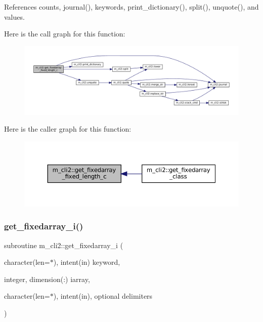 References counts, journal(), keywords, print\+\_\+dictionary(), split(), unquote(), and values.

Here is the call graph for this function\+:\nopagebreak
\begin{figure}[H]
\begin{center}
\leavevmode
\includegraphics[width=350pt]{namespacem__cli2_a8000c5e05f6c84ba17350d4a00850a6a_cgraph}
\end{center}
\end{figure}
Here is the caller graph for this function\+:\nopagebreak
\begin{figure}[H]
\begin{center}
\leavevmode
\includegraphics[width=350pt]{namespacem__cli2_a8000c5e05f6c84ba17350d4a00850a6a_icgraph}
\end{center}
\end{figure}
\mbox{\label{namespacem__cli2_aa469ba94e6bb122c9bf30dd8642b693b}} 
\subsubsection{\texorpdfstring{get\+\_\+fixedarray\+\_\+i()}{get\_fixedarray\_i()}}
{\footnotesize\ttfamily subroutine m\+\_\+cli2\+::get\+\_\+fixedarray\+\_\+i (\begin{DoxyParamCaption}\item[{character(len=$\ast$), intent(in)}]{keyword,  }\item[{integer, dimension(\+:)}]{iarray,  }\item[{character(len=$\ast$), intent(in), optional}]{delimiters }\end{DoxyParamCaption})\hspace{0.3cm}{\ttfamily [private]}}



